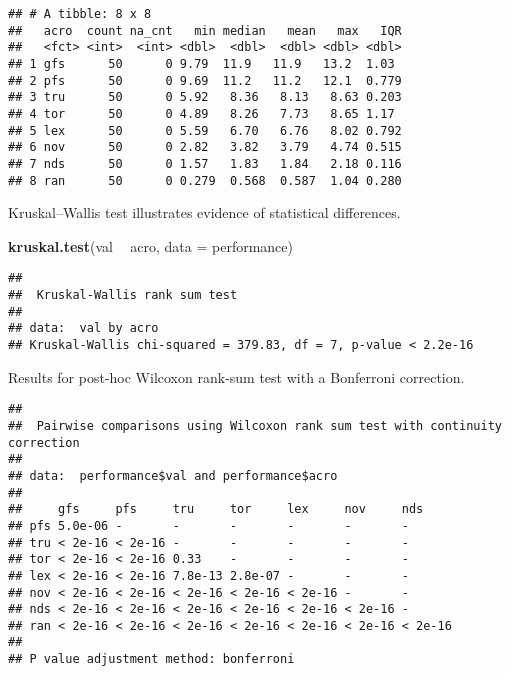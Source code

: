 \documentclass[]{book}
\newenvironment{Shaded}{\begin{snugshade}}{\end{snugshade}}
\newcommand{\DataTypeTok}[1]{\textcolor[rgb]{0.13,0.29,0.53}{#1}}
\newcommand{\KeywordTok}[1]{\textcolor[rgb]{0.13,0.29,0.53}{\textbf{#1}}}
\newcommand{\NormalTok}[1]{#1}
\newcommand{\OperatorTok}[1]{\textcolor[rgb]{0.81,0.36,0.00}{\textbf{#1}}}
\newcommand{\OtherTok}[1]{\textcolor[rgb]{0.56,0.35,0.01}{#1}}
\newcommand{\StringTok}[1]{\textcolor[rgb]{0.31,0.60,0.02}{#1}}
\begin{document}
\begin{verbatim}
## # A tibble: 8 x 8
##   acro  count na_cnt   min median   mean   max   IQR
##   <fct> <int>  <int> <dbl>  <dbl>  <dbl> <dbl> <dbl>
## 1 gfs      50      0 9.79  11.9   11.9   13.2  1.03 
## 2 pfs      50      0 9.69  11.2   11.2   12.1  0.779
## 3 tru      50      0 5.92   8.36   8.13   8.63 0.203
## 4 tor      50      0 4.89   8.26   7.73   8.65 1.17 
## 5 lex      50      0 5.59   6.70   6.76   8.02 0.792
## 6 nov      50      0 2.82   3.82   3.79   4.74 0.515
## 7 nds      50      0 1.57   1.83   1.84   2.18 0.116
## 8 ran      50      0 0.279  0.568  0.587  1.04 0.280
\end{verbatim}

Kruskal--Wallis test illustrates evidence of statistical differences.

\begin{Shaded}
\begin{Highlighting}[]
\KeywordTok{kruskal.test}\NormalTok{(val }\OperatorTok{~}\StringTok{ }\NormalTok{acro, }\DataTypeTok{data =}\NormalTok{ performance)}
\end{Highlighting}
\end{Shaded}

\begin{verbatim}
## 
##  Kruskal-Wallis rank sum test
## 
## data:  val by acro
## Kruskal-Wallis chi-squared = 379.83, df = 7, p-value < 2.2e-16
\end{verbatim}

Results for post-hoc Wilcoxon rank-sum test with a Bonferroni correction.

\begin{Shaded}
\end{Shaded}

\begin{verbatim}
## 
##  Pairwise comparisons using Wilcoxon rank sum test with continuity correction 
## 
## data:  performance$val and performance$acro 
## 
##     gfs     pfs     tru     tor     lex     nov     nds    
## pfs 5.0e-06 -       -       -       -       -       -      
## tru < 2e-16 < 2e-16 -       -       -       -       -      
## tor < 2e-16 < 2e-16 0.33    -       -       -       -      
## lex < 2e-16 < 2e-16 7.8e-13 2.8e-07 -       -       -      
## nov < 2e-16 < 2e-16 < 2e-16 < 2e-16 < 2e-16 -       -      
## nds < 2e-16 < 2e-16 < 2e-16 < 2e-16 < 2e-16 < 2e-16 -      
## ran < 2e-16 < 2e-16 < 2e-16 < 2e-16 < 2e-16 < 2e-16 < 2e-16
## 
## P value adjustment method: bonferroni
\end{verbatim}
\end{document}
